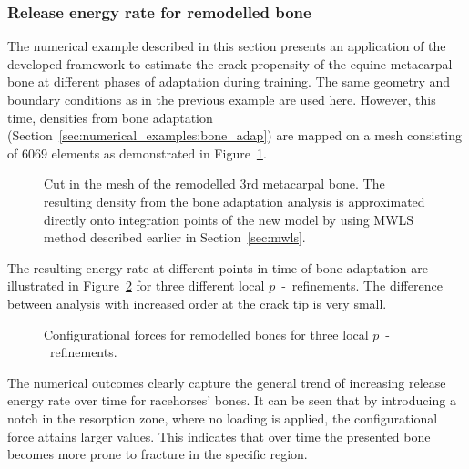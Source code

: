 \documentclass[11pt]{acmeArticle}
\numberwithin{equation}{section}
\begin{document}
\subsubsection{Release energy rate for remodelled bone}
The numerical example described in this section presents an application of the developed framework to estimate the crack propensity of the equine metacarpal bone at different phases of adaptation during training. 
The same geometry and boundary conditions as in the previous example are used here. 
However, this time, densities from bone adaptation (Section~\ref{sec:numerical_examples:bone_adap}) are mapped on a mesh consisting of 6069 elements as demonstrated in Figure~\ref{fig:frackmeshcutting}. 
\begin{figure}
	\centering
			\def\svgwidth{12cm}
		
	\caption{Cut in the mesh of the remodelled 3rd metacarpal bone. The resulting density from the bone adaptation analysis is approximated directly onto integration points of the new model by using MWLS method described earlier in Section~\ref{sec:mwls}. }
	\label{fig:frackmeshcutting}
\end{figure}
The resulting energy rate at different points in time of bone adaptation are illustrated in Figure~\ref{fig:crackmc3release} for three different local $p$~-~refinements. The difference between analysis with increased order at the crack tip is very small. 
\begin{figure}
	\centering
	\caption{Configurational forces for remodelled bones for three local $p$~-~refinements.}
	\label{fig:crackmc3release}
\end{figure}
The numerical outcomes clearly capture the general trend of increasing release energy rate over time for racehorses' bones. It can be seen that by introducing a notch in the resorption zone, where no loading is applied, the configurational force attains larger values. This indicates that over time the presented bone becomes more prone to fracture in the specific region. 
\end{document}
